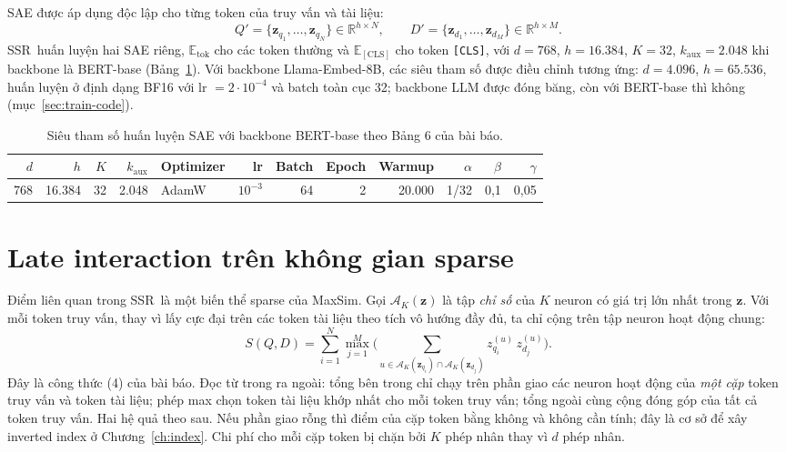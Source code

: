 \documentclass[a4paper,13pt]{extreport}
\theoremstyle{plain}
\newcommand{\ssr}{SSR}
\newcommand{\Rb}{\mathbb{R}}
\newcommand{\bz}{\mathbf{z}}
\newcommand{\AK}{\mathcal{A}_K}
\begin{document}
SAE được áp dụng độc lập cho từng token của truy vấn và tài liệu:
\begin{equation}
Q'=\{\bz_{q_1},\dots,\bz_{q_N}\}\in\Rb^{h\times N},\qquad
D'=\{\bz_{d_1},\dots,\bz_{d_M}\}\in\Rb^{h\times M}.
\label{eq:qd-sparse}
\end{equation}
\ssr\ huấn luyện hai SAE riêng, $\mathbb{E}_{\mathrm{tok}}$ cho các token thường và $\mathbb{E}_{[\mathrm{CLS}]}$ cho token \texttt{[CLS]}, với $d=768$, $h=16.384$, $K=32$, $k_{\mathrm{aux}}=2.048$ khi backbone là BERT-base (Bảng~\ref{tab:hyper}). Với backbone Llama-Embed-8B, các siêu tham số được điều chỉnh tương ứng: $d=4.096$, $h=65.536$, huấn luyện ở định dạng BF16 với lr $=2\cdot10^{-4}$ và batch toàn cục 32; backbone LLM được đóng băng, còn với BERT-base thì không (mục~\ref{sec:train-code}).

\begin{table}[htbp]
\centering
\caption{Siêu tham số huấn luyện SAE với backbone BERT-base theo Bảng 6 của bài báo.}
\label{tab:hyper}
\small
\begin{tabular}{rrrrlrrrrrrr}
\toprule
$d$ & $h$ & $K$ & $k_{\mathrm{aux}}$ & Optimizer & lr & Batch & Epoch & Warmup & $\alpha$ & $\beta$ & $\gamma$\\
\midrule
768 & 16.384 & 32 & 2.048 & AdamW & $10^{-3}$ & 64 & 2 & 20.000 & 1/32 & 0,1 & 0,05\\
\bottomrule
\end{tabular}
\end{table}

\section{Late interaction trên không gian sparse}
\label{sec:sparse-maxsim}
Điểm liên quan trong \ssr\ là một biến thể sparse của MaxSim. Gọi $\AK(\bz)$ là tập \emph{chỉ số} của $K$ neuron có giá trị lớn nhất trong $\bz$. Với mỗi token truy vấn, thay vì lấy cực đại trên các token tài liệu theo tích vô hướng đầy đủ, ta chỉ cộng trên tập neuron hoạt động chung:
\begin{equation}
S(Q,D)=\sum_{i=1}^{N}\max_{j=1}^{M}\Bigg(\sum_{u\in\AK(\bz_{q_i})\cap\AK(\bz_{d_j})} z^{(u)}_{q_i}\, z^{(u)}_{d_j}\Bigg).
\label{eq:ssr}
\end{equation}
Đây là công thức (4) của bài báo. Đọc từ trong ra ngoài: tổng bên trong chỉ chạy trên phần giao các neuron hoạt động của \emph{một cặp} token truy vấn và token tài liệu; phép max chọn token tài liệu khớp nhất cho mỗi token truy vấn; tổng ngoài cùng cộng đóng góp của tất cả token truy vấn. Hai hệ quả theo sau. Nếu phần giao rỗng thì điểm của cặp token bằng không và không cần tính; đây là cơ sở để xây inverted index ở Chương~\ref{ch:index}. Chi phí cho mỗi cặp token bị chặn bởi $K$ phép nhân thay vì $d$ phép nhân.
\end{document}
